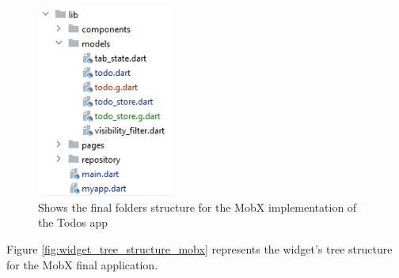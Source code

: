 \begin{figure}[H]
    \centering
    \includegraphics[width=0.4\textwidth]{Images/struttura_cartelle_mobx.png}
    \caption{Shows the final folders structure for the MobX implementation of the Todos app}
    \label{fig:struttura_cartelle_mobx}
\end{figure}
Figure \ref{fig:widget_tree_structure_mobx} represents the widget's tree structure for the MobX final application. 
